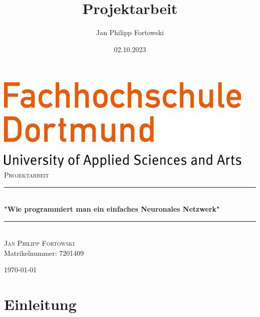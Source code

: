 \documentclass[12pt]{article}
\title{\textbf{Projektarbeit}}
\author{Jan Philipp Fortowski}
\date{02.10.2023}
\begin{document}
\cleardoublepage

\thispagestyle{empty}

\begin{titlepage}
\newcommand{\HRule}{\rule{\linewidth}{0.5mm}}
\center
\includegraphics[scale=0.5]{./Images/FHD.jpeg} \\[1cm]
\textsc{\LARGE Projektarbeit } \\[1cm]
\HRule \\[0.4cm]
{ \huge \bfseries "Wie programmiert man ein einfaches Neuronales Netzwerk" \\[0.15cm] }
\HRule \\[1.5cm]
\textsc{\LARGE Jan Philipp Fortowski } \\[1cm]

\large Matrikelnummer: 7201409

\large \today \\ [1cm]
\end{titlepage}

\tableofcontents
\cleardoublepage
\thispagestyle{empty}

\section{Einleitung}
\end{document}
